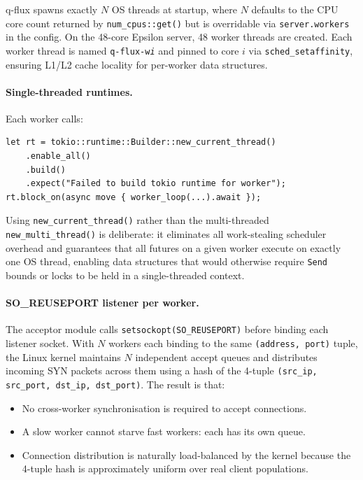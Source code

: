 \documentclass[a4paper, 11pt]{article}
\begin{document}
q-flux spawns exactly $N$ OS threads at startup, where $N$ defaults to the
CPU core count returned by \texttt{num\_cpus::get()} but is overridable via
\texttt{server.workers} in the config.  On the 48-core Epsilon server, 48
worker threads are created.  Each worker thread is named
\texttt{q-flux-w\textit{i}} and pinned to core $i$ via \texttt{sched\_setaffinity},
ensuring L1/L2 cache locality for per-worker data structures.

\paragraph{Single-threaded runtimes.}  Each worker calls:
\begin{lstlisting}[caption={Worker runtime instantiation (worker.rs).}]
let rt = tokio::runtime::Builder::new_current_thread()
    .enable_all()
    .build()
    .expect("Failed to build tokio runtime for worker");
rt.block_on(async move { worker_loop(...).await });
\end{lstlisting}
Using \texttt{new\_current\_thread()} rather than the multi-threaded
\texttt{new\_multi\_thread()} is deliberate: it eliminates all work-stealing
scheduler overhead and guarantees that all futures on a given worker execute on
exactly one OS thread, enabling data structures that would otherwise require
\texttt{Send} bounds or locks to be held in a single-threaded context.

\paragraph{SO\_REUSEPORT listener per worker.}  The acceptor module calls
\texttt{setsockopt(SO\_REUSEPORT)} before binding each listener socket.  With
$N$ workers each binding to the same \texttt{(address, port)} tuple, the Linux
kernel maintains $N$ independent accept queues and distributes incoming SYN
packets across them using a hash of the 4-tuple
\texttt{(src\_ip, src\_port, dst\_ip, dst\_port)}.  The result is that:
\begin{itemize}
  \item No cross-worker synchronisation is required to accept connections.
  \item A slow worker cannot starve fast workers: each has its own queue.
  \item Connection distribution is naturally load-balanced by the kernel
        because the 4-tuple hash is approximately uniform over real client
        populations.
\end{itemize}
\end{document}
